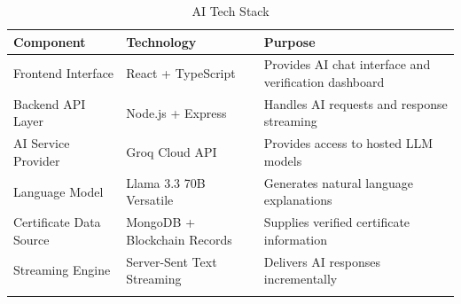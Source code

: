 \begin{longtable}{|m{3.5cm}|m{3.5cm}|m{7.0cm}|}
    \hline
    \textbf{Component} & \textbf{Technology} & \textbf{Purpose}\\
    \hline
    \endfirsthead
    
    Frontend Interface
    & React + TypeScript
    & Provides AI chat interface and verification dashboard\\
    \hline

    Backend API Layer
    & Node.js + Express
    & Handles AI requests and response streaming\\
    \hline

    AI Service Provider
    & Groq Cloud API
    & Provides access to hosted LLM models\\
    \hline

    Language Model
    & Llama 3.3 70B Versatile
    & Generates natural language explanations\\
    \hline

    Certificate Data Source
    & MongoDB + Blockchain Records
    & Supplies verified certificate information\\
    \hline

    Streaming Engine
    & Server-Sent Text Streaming
    & Delivers AI responses incrementally\\
    \hline
    
    \caption{AI Tech Stack}
    \label{tab:ai_tech_stack}
\end{longtable}

